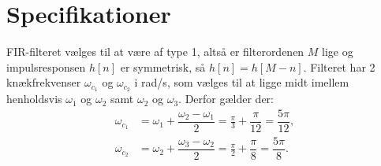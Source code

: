 \section{Specifikationer}
FIR-filteret vælges til at være af type 1, altså er filterordenen $M$ lige og impulsresponsen $h[n]$ er symmetrisk, så $h[n] = h[M - n]$. Filteret har 2 knækfrekvenser $\omega_{c_1}$ og $\omega_{c_2}$ i rad/s, som vælges til at ligge midt imellem henholdsvis $\omega_1$ og $\omega_2$ samt $\omega_2$ og $\omega_3$. Derfor gælder der:
\begin{align*}
\omega_{c_1} &= \omega_1 + \dfrac{\omega_2 - \omega_1}{2} = \frac{\pi}{3} + \dfrac{\pi}{12} = \dfrac{5\pi}{12}, \\
\omega_{c_2} &= \omega_2 + \dfrac{\omega_3 - \omega_2}{2} = \frac{\pi}{2} + \dfrac{\pi}{8} = \dfrac{5\pi}{8}. \\
\end{align*}